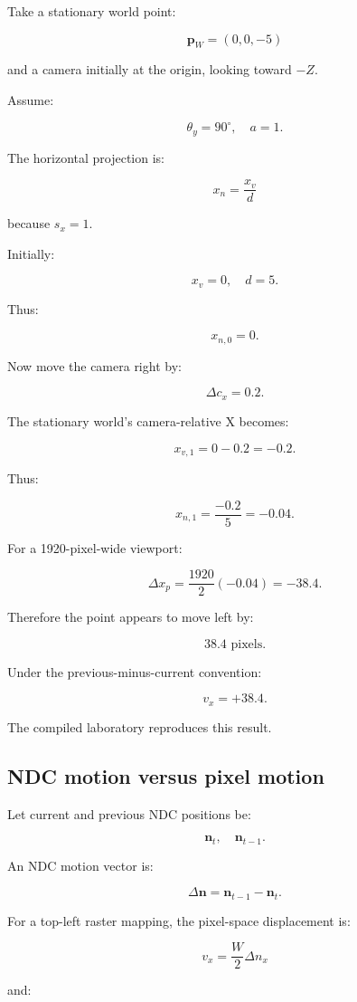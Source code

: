 Take a stationary world point:

\[
 \mathbf p_W=(0,0,-5)
\]

and a camera initially at the origin, looking toward \(-Z\).

Assume:

\[
 \theta_y=90^\circ,\quad a=1.
\]

The horizontal projection is:

\[
 x_n=\frac{x_v}{d}
\]

because \(s_x=1\).

Initially:

\[
 x_v=0,\quad d=5.
\]

Thus:

\[
 x_{n,0}=0.
\]

Now move the camera right by:

\[
 \Delta c_x=0.2.
\]

The stationary world's camera-relative X becomes:

\[
 x_{v,1}=0-0.2=-0.2.
\]

Thus:

\[
 x_{n,1}=\frac{-0.2}{5}=-0.04.
\]

For a 1920-pixel-wide viewport:

\[
 \Delta x_p=\frac{1920}{2}(-0.04) =-38.4.
\]

Therefore the point appears to move left by:

\[
 \boxed{38.4\text{ pixels}}.
\]

Under the previous-minus-current convention:

\[
 v_x=+38.4.
\]

The compiled laboratory reproduces this result.

\subsection{NDC motion versus pixel motion}\label{02-foundations-ii-ch036-ndc-motion-versus-pixel-motion}

Let current and previous NDC positions be:

\[
 \mathbf n_t,\quad\mathbf n_{t-1}.
\]

An NDC motion vector is:

\[
 \Delta\mathbf n=\mathbf n_{t-1}-\mathbf n_t.
\]

For a top-left raster mapping, the pixel-space displacement is:

\[
 \boxed{ v_x=\frac W2\Delta n_x }
\]

and:

